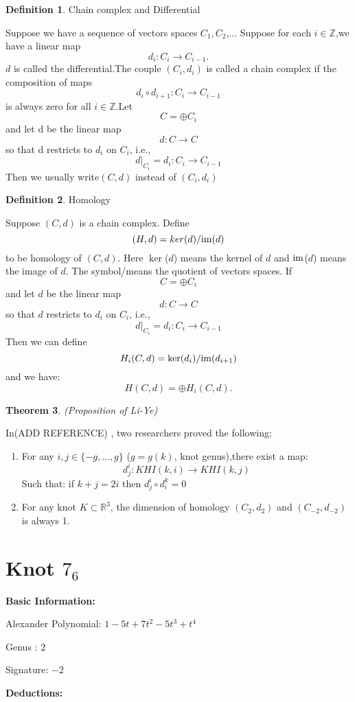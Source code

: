\documentclass{amsart}
\newtheorem{thm}{Theorem}[section]
\theoremstyle{definition}
\newtheorem{defn}[thm]{Definition}
\newcommand{\im}{{\rm im}}
\begin{document}
\begin{defn}
Chain complex and Differential
\end{defn}
Suppose we have a sequence of vectors spaces $C_{1},C_{2}$,... Suppose for each $i\in\mathbb{Z}$,we have a linear map
\[d_{i}:C_{i}\rightarrow C_{i-1}.\]
$d$ is called the differential.The couple $({C_{i},{d_{i}}})$ is called a chain complex if the composition of maps
\[d_{i}\circ d_{i+1}:C_{i}\rightarrow C_{i-1}\]
is always zero for all $i\in\mathbb{Z}$.Let
\[C=\oplus C_{i}\]
and let d be the linear map
\[d:C\rightarrow C\]
so that d restricts to $d_{i}$ on $C_{i}$, i.e.,
\[d|_{C_{i}}=d_{i}:C_{i}\rightarrow C_{i-1}\]
Then we usually write$(C,d)$ instead of $({C_{i}},{d_{i}})$

\begin{defn}
Homology
\end{defn}
Suppose $(C,d)$ is a chain complex. Define
\[(H,d)=ker (d)/\im (d)\]
to be homology of $(C,d)$. Here $\ker$($d$) means the kernel of $d$ and $\im$($d$) means the image of $d$.
The symbol/means the quotient of vectors spaces. If
\[C=\oplus C_{i}\]
and let $d$ be the linear map
\[d:C\rightarrow C\]
so that $d$ restricts to $d_{i}$ on $C_{i}$, i.e.,
\[d|_{C_{i}}=d_{i}:C_{i}\rightarrow C_{i-1}\]
Then we can define
\[H_{i}(C,d)=\ker(d_{i})/\im(d_{i+1})\]
and we have:
\[H(C,d)=\oplus H_{i}(C,d).\]

\begin{thm}
(Proposition of Li-Ye)
\end{thm}
In(ADD REFERENCE) , two researchers proved the following:
\begin{enumerate}
\item
For any $i,j\in \{-g,...,g\}$ ($g=g(k)$, knot genus),there exist a map:
\[d^{i}_{j}:KHI(k,i)\rightarrow KHI(k,j)\]
Such that: if $k+j=2i$ then $d^{i}_{j}\circ d^{k}_{i}=0$
\item
For any knot $K \subset\mathbb{R}^3$, the dimension of homology $(C_{2},d_{2})$ and $(C_{-2},d_{-2})$ is always 1.
\end{enumerate}


\section{Knot $7_6$}
\textbf{Basic Information:}

Alexander Polynomial: 	$1-5t+7t^2-5t^3+t^4$ 

Genus : $2$

Signature: $-2$
\bigskip

\textbf{Deductions:} 
\bigskip
\end{document}
